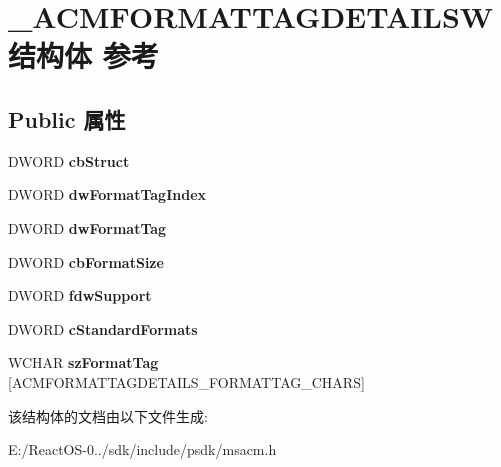 \hypertarget{struct___a_c_m_f_o_r_m_a_t_t_a_g_d_e_t_a_i_l_s_w}{}\section{\+\_\+\+A\+C\+M\+F\+O\+R\+M\+A\+T\+T\+A\+G\+D\+E\+T\+A\+I\+L\+S\+W结构体 参考}
\label{struct___a_c_m_f_o_r_m_a_t_t_a_g_d_e_t_a_i_l_s_w}
\subsection*{Public 属性}
\begin{DoxyCompactItemize}
\item 
\mbox{\label{struct___a_c_m_f_o_r_m_a_t_t_a_g_d_e_t_a_i_l_s_w_abade29342c78ab1df6311ab28e5562f4}} 
D\+W\+O\+RD {\bfseries cb\+Struct}
\item 
\mbox{\label{struct___a_c_m_f_o_r_m_a_t_t_a_g_d_e_t_a_i_l_s_w_acf99ec38f200f6fe2853f4edf12adcdb}} 
D\+W\+O\+RD {\bfseries dw\+Format\+Tag\+Index}
\item 
\mbox{\label{struct___a_c_m_f_o_r_m_a_t_t_a_g_d_e_t_a_i_l_s_w_a8d047b90434423a33273a5673572bb7c}} 
D\+W\+O\+RD {\bfseries dw\+Format\+Tag}
\item 
\mbox{\label{struct___a_c_m_f_o_r_m_a_t_t_a_g_d_e_t_a_i_l_s_w_a8ab4ef365e9abff571be87241caddc87}} 
D\+W\+O\+RD {\bfseries cb\+Format\+Size}
\item 
\mbox{\label{struct___a_c_m_f_o_r_m_a_t_t_a_g_d_e_t_a_i_l_s_w_ab621848fe2e348d22009648e700df3c9}} 
D\+W\+O\+RD {\bfseries fdw\+Support}
\item 
\mbox{\label{struct___a_c_m_f_o_r_m_a_t_t_a_g_d_e_t_a_i_l_s_w_afbd4a1d90ce308823c4ea8ebccc660e5}} 
D\+W\+O\+RD {\bfseries c\+Standard\+Formats}
\item 
\mbox{\label{struct___a_c_m_f_o_r_m_a_t_t_a_g_d_e_t_a_i_l_s_w_a6ba6ba7254a2229f691438a9b0befd6a}} 
W\+C\+H\+AR {\bfseries sz\+Format\+Tag} \mbox{[}A\+C\+M\+F\+O\+R\+M\+A\+T\+T\+A\+G\+D\+E\+T\+A\+I\+L\+S\+\_\+\+F\+O\+R\+M\+A\+T\+T\+A\+G\+\_\+\+C\+H\+A\+RS\mbox{]}
\end{DoxyCompactItemize}


该结构体的文档由以下文件生成\+:\begin{DoxyCompactItemize}
\item 
E\+:/\+React\+O\+S-\/0../sdk/include/psdk/msacm.\+h\end{DoxyCompactItemize}
